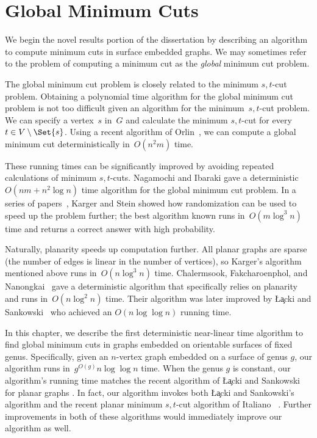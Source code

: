 \chapter{Global Minimum Cuts}
\label{chap:global-cut}

We begin the novel results portion of the dissertation by describing an algorithm to compute minimum cuts in surface embedded graphs. We may sometimes refer to the problem of computing a minimum cut as the \emph{global} minimum cut problem.

The global minimum cut problem is closely related to the minimum $s,t$-cut problem.
Obtaining a polynomial time algorithm for the global minimum cut problem is not too difficult given an algorithm for the minimum~$s,t$-cut problem. We can specify a vertex~$s$ in~$G$ and calculate the minimum $s,t$-cut for every~$t \in V \setminus \Set{s}$. Using a recent algorithm of Orlin~\cite{o-mfotl-13}, we can compute a global minimum cut deterministically in~$O(n^2 m)$ time.

These running times can be significantly improved by avoiding repeated calculations of minimum $s,t$-cuts. Nagamochi and Ibaraki gave a deterministic~$O(nm + n^2 \log n)$ time algorithm for the global minimum cut problem.
In a series of papers~\cite{ks-oamc-93,k-rscfn-99,k-mcnlt-00}, Karger and Stein showed how randomization can be used to speed up the problem further; the best algorithm known runs in~$O(m \log^3n)$ time and returns a correct answer with high probability.

Naturally, planarity speeds up computation further. All planar graphs are sparse (the number of edges is linear in the number of vertices), so Karger's algorithm~\cite{k-mcnlt-00} mentioned above runs in~$O(n \log^3 n)$ time. Chalermsook, Fakcharoenphol, and Nanongkai~\cite{cfn-dnlta-04} gave a deterministic algorithm that specifically relies on planarity and runs in~$O(n \log^2 n)$ time. Their algorithm was later improved by \L\c{a}cki and Sankowski~\cite{ls-mcsc-11} who achieved an $O(n \log \log n)$ running time.

In this chapter, we describe the first deterministic near-linear time algorithm to find global minimum cuts in graphs embedded on orientable surfaces of fixed genus.  Specifically, given an $n$-vertex graph embedded on a surface of genus $g$, our algorithm runs in~$g^{O(g)}n \log \log n$ time.  When the genus $g$ is constant, our algorithm's running time matches the recent algorithm of \L\c{a}cki and Sankowski for planar graphs \cite{ls-mcsc-11}.  In fact, our algorithm invokes both \L\c{a}cki and Sankowski's algorithm and the recent planar minimum $s,t$-cut algorithm of Italiano \etal~\cite{insw-iamcmf-11}.  Further improvements in both of these algorithms would immediately improve our algorithm as well.

